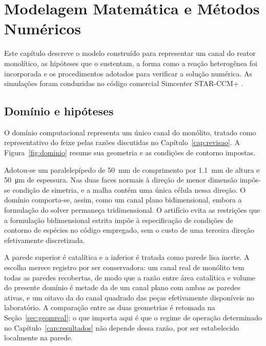 \chapter{Modelagem Matemática e Métodos Numéricos}
\label{cap:modelagem}

Este capítulo descreve o modelo construído para representar um canal do reator
monolítico, as hipóteses que o sustentam, a forma como a reação heterogênea foi
incorporada e os procedimentos adotados para verificar a solução numérica. As
simulações foram conduzidas no código comercial Simcenter STAR-CCM+
\parencite{StarCCMUserGuide}.

\section{Domínio e hipóteses}

O domínio computacional representa um único canal do monólito, tratado como
representativo do feixe pelas razões discutidas no
Capítulo~\ref{cap:revisao}. A Figura~\ref{fig:dominio} resume sua geometria e
as condições de contorno impostas.

Adotou-se um paralelepípedo de \SI{50}{\milli\meter} de comprimento por
\SI{1.1}{\milli\meter} de altura e \SI{50}{\micro\meter} de espessura. Nas duas
faces normais à direção de menor dimensão impôs-se condição de simetria, e a
malha contém uma única célula nessa direção. O domínio comporta-se, assim, como
um canal plano bidimensional, embora a formulação do solver permaneça
tridimensional. O artifício evita as restrições que a formulação bidimensional
estrita impõe à especificação de condições de contorno de espécies no código
empregado, sem o custo de uma terceira direção efetivamente discretizada.

A parede superior é catalítica e a inferior é tratada como parede lisa inerte.
A escolha merece registro por ser conservadora: um canal real de monólito tem
todas as paredes recobertas, de modo que a razão entre área catalítica e volume
do presente domínio é metade da de um canal plano com ambas as paredes ativas,
e um oitavo da do canal quadrado das peças efetivamente disponíveis no
laboratório. A comparação entre as duas geometrias é retomada na
Seção~\ref{sec:geomreal}; o que importa aqui é que o regime de operação
determinado no Capítulo~\ref{cap:resultados} não depende dessa razão, por ser
estabelecido localmente na parede.

